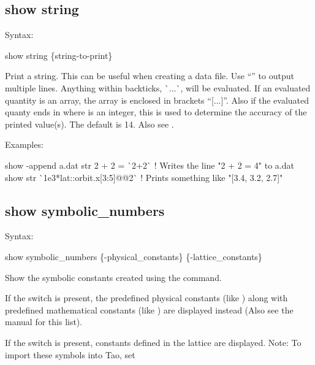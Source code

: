 {{{{{{{{{{%

\subsection{show string}
\label{s:show.string}

Syntax:
\begin{example}
  show string \{string-to-print\}
\end{example}

Print a string. This can be useful when creating a data file. Use ``'' to output multiple
lines. Anything within backticks, \`{}...\`{}, will be evaluated. If an evaluated quantity is an
array, the array is enclosed in brackets ``[...]''. Also if the evaluated quanty ends in
 where  is an integer, this is used to determine the accuracy of the printed
value(s). The default is 14. Also see .

Examples:
\begin{example}
  show -append a.dat str 2 + 2 = \`{}2+2\`{} ! Writes the line "2 + 2 = 4" to a.dat
  show str \`{}1e3*lat::orbit.x[3:5]@@2\`{}  ! Prints something like "[3.4, 3.2, 2.7]"
\end{example}


\subsection{show symbolic_numbers}
\label{s:show.symbolic}

Syntax:
\begin{example}
  show symbolic_numbers \{-physical_constants\} \{-lattice_constants\}
\end{example}

Show the symbolic constants created using the  command. 

If the  switch is present, the predefined physical constants (like
) along with predefined mathematical constants (like ) are displayed instead
(Also see the \bmad manual for this list).

If the  switch is present, constants defined in the lattice are displayed.
Note: To import these symbols into Tao, set \vn{global%
\vn{-symbol_import} switch on the startup command line). The default is to not import lattice
symbols.

}}}}}}}}}}}
